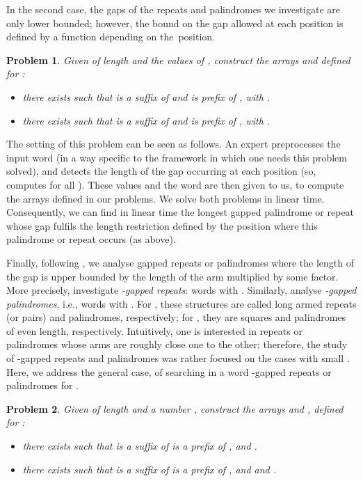 \documentclass[final]{dmtcs-episciences}
\newtheorem{problem}{Problem}
\begin{document}
In the second case, the gaps of the repeats and palindromes we investigate are only lower bounded; however, the bound on the gap allowed at each position is defined by a function depending on the~position.
\begin{problem}\label{LPFg(i)}
Given  of length  and the values  of , construct the arrays  and  defined for :
\begin{itemize}
\item[a.]  there exists  such that  is a suffix of  and  is prefix of , with .
\item[b.]  there exists  such that  is a suffix of  and  is prefix of , with .
\end{itemize}
\end{problem}
The setting of this problem can be seen as follows. An expert preprocesses the input word (in a way specific to the framework in which one needs this problem solved), and detects the length of the gap occurring at each position (so, computes  for all ). These values and the word are then given to us, to compute the arrays defined in our problems. We solve both problems in linear time. Consequently, we can find in linear time the longest gapped palindrome or repeat whose gap fulfils the length restriction defined by the position where this palindrome or repeat occurs (as above).

Finally, following \cite{KK09,KolpakovPPK14}, we analyse gapped repeats  or palindromes  where the length of the gap  is upper bounded by the length of the arm  multiplied by some factor. More precisely, \cite{KolpakovPPK14} investigate {\em -gapped repeats}: words  with . Similarly, \cite{KK09} analyse {\em -gapped palindromes}, i.e., words  with .  For , these structures are called long armed repeats (or pairs) and palindromes, respectively; for , they are squares and palindromes of even length, respectively. Intuitively, one is interested in repeats or palindromes whose arms are roughly close one to the other; therefore, the study of -gapped repeats and palindromes was rather focused on the cases with small . Here, we address the general case, of searching in a word  -gapped repeats or palindromes for .

\begin{problem}\label{LLAP}
Given   of length  and a number , construct the arrays  and , defined for :
\begin{itemize}
\item[a.] there exists  such that  is a suffix of  is a prefix of , and .
\item[b.] there exists  such that  is a suffix of  is a prefix of , and and .
\end{itemize}
\end{problem}
\end{document}
